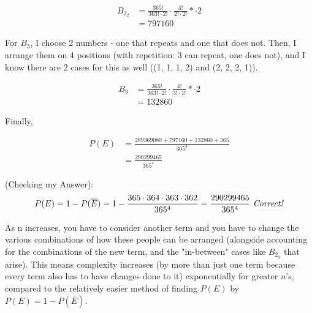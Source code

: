 \documentclass[11pt]{article}
\begin{document}
\begin{flushleft}
\begin{enumerate}
{\begin{enumerate}
{				      				      			\begin{align*}
				      				      				B_{2_2} & = \frac{365!}{363!\cdot 2!} \cdot \frac{4!}{2!\cdot 2!} * \cdot 2 \\
				      				      				        & = 797160                                                          
				      				      			\end{align*}
				      				      			
				      				      			For $B_3$, I choose 2 numbers - one that repeats and one that does not. Then, I arrange them on 4 positions (with repetition: 3 can repeat, one does not), and I know there are 2 cases for this as well ((1, 1, 1, 2) and (2, 2, 2, 1)).
				      				      			
				      				      			\begin{align*}
				      				      				B_3 & = \frac{365!}{363!\cdot 2!} \cdot \frac{4!}{3!\cdot 1!} * \cdot 2 \\
				      				      				    & = 132860                                                          
				      				      			\end{align*}
				      				      			
				      				      			Finally,
				      				      			
				      				      			\begin{align*}
				      				      				P(E) & = \frac{289369080 + 797160 + 132860 + 365}{365^4} \\
				      				      				     & = \frac{290299465}{365^4}                         
				      				      			\end{align*}
				      				      			
				      				      			(Checking my Answer):
				      				      			\begin{align*}
				      				      				P(E) = 1 - P(\overline{E}) = 1 - \frac{365\cdot 364\cdot 363\cdot 362}{365^4} = \frac{290299465}{365^4} \text{ \emph{Correct!}} 
				      				      			\end{align*}
				      				      			
				      				      			As n increases, you have to consider another term and you have to change the various combinations of how these people can be arranged (alongside accounting for the combinations of the new term, and the "in-between" cases like $B_{2_2}$ that arise). This means complexity increases (by more than just one term because every term also has to have changes done to it) exponentially for greater $n$'s, compared to the relatively easier method of finding $P(E)$ by $P(E) = 1 - P(\overline{E})$.
				      				      		}
				      				      	\end{enumerate}
				      				      }
				      				      

\end{enumerate}
\end{flushleft}
\end{document}
